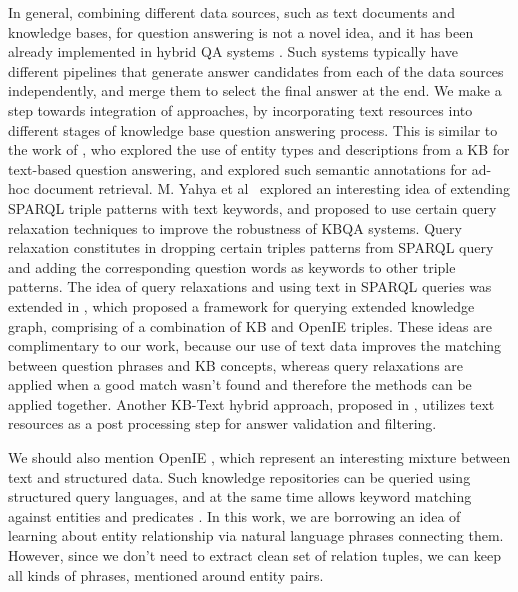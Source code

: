 In general, combining different data sources, such as text documents and knowledge bases, for question answering is not a novel idea, and it has been already implemented in hybrid QA systems \cite{baudivs2015modeling,Barker12}.
Such systems typically have different pipelines that generate answer candidates from each of the data sources independently, and merge them to select the final answer at the end.
We make a step towards integration of approaches, by incorporating text resources into different stages of knowledge base question answering process.
This is similar to the work of \cite{Sun:2015:ODQ:2736277.2741651}, who explored the use of entity types and descriptions from a KB for text-based question answering, and \cite{dalton2014entity} explored such semantic annotations for ad-hoc document retrieval.
M. Yahya et al~\cite{yahya2013robust} explored an interesting idea of extending SPARQL triple patterns with text keywords, and proposed to use certain query relaxation techniques to improve the robustness of KBQA systems.
Query relaxation constitutes in dropping certain triples patterns from SPARQL query and adding the corresponding question words as keywords to other triple patterns.
The idea of query relaxations and using text in SPARQL queries was extended in \cite{yahya2016relationship}, which proposed a framework for querying extended knowledge graph, comprising of a combination of KB and OpenIE triples.
These ideas are complimentary to our work, because our use of text data improves the matching between question phrases and KB concepts, whereas query relaxations are applied when a good match wasn't found and therefore the methods can be applied together.
Another KB-Text hybrid approach, proposed in \cite{xu2016enhancing}, utilizes text resources as a post processing step for answer validation and filtering.

We should also mention OpenIE \cite{fader2011identifying}, which represent an interesting mixture between text and structured data.
Such knowledge repositories can be queried using structured query languages, and at the same time allows keyword matching against entities and predicates \cite{Fader:2014:OQA:2623330.2623677}.
In this work, we are borrowing an idea of learning about entity relationship via natural language phrases connecting them.
However, since we don't need to extract clean set of relation tuples, we can keep all kinds of phrases, mentioned around entity pairs.

